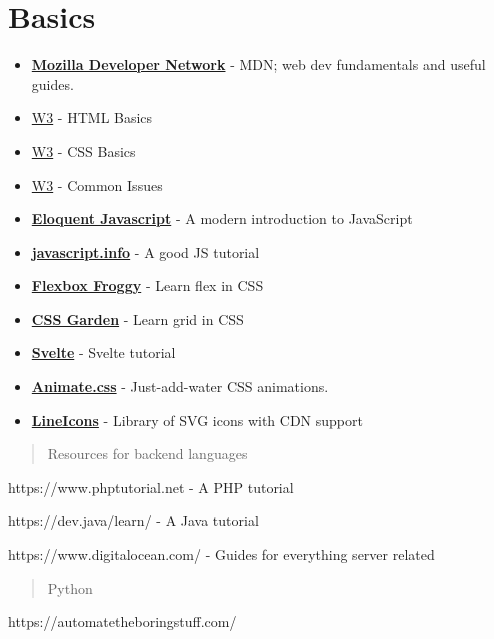 \hypertarget{basics}{%
\section{Basics}\label{basics}}

\begin{itemize}
\item
  \textbf{\href{https://developer.mozilla.org/en-US/docs/Learn}{Mozilla
  Developer Network}} - MDN; web dev fundamentals and useful guides.
\item
  \href{https://www.w3schools.com/html/default.asp}{W3} - HTML Basics
\item
  \href{https://www.w3schools.com/css/default.asp}{W3} - CSS Basics
\item
  \href{https://www.w3schools.com/howto/default.asp}{W3} - Common Issues
\item
  \textbf{\href{https://eloquentjavascript.net/Eloquent_JavaScript.pdf}{Eloquent
  Javascript}} - A modern introduction to JavaScript
\item
  \textbf{\href{https://javascript.info/}{javascript.info}} - A good JS
  tutorial
\item
  \textbf{\href{https://flexboxfroggy.com/}{Flexbox Froggy}} - Learn
  flex in CSS
\item
  \textbf{\href{https://cssgridgarden.com/}{CSS Garden}} - Learn grid in
  CSS
\item
  \textbf{\href{https://learn.svelte.dev/tutorial/welcome-to-svelte}{Svelte}}
  - Svelte tutorial
\item
  \textbf{\href{http://daneden.github.io/animate.css/}{Animate.css}} -
  Just-add-water CSS animations.
\item
  \textbf{\href{https://lineicons.com/icons/}{LineIcons}} - Library of
  SVG icons with CDN support
\end{itemize}

\begin{quote}
Resources for backend languages
\end{quote}

https://www.phptutorial.net - A PHP tutorial

https://dev.java/learn/ - A Java tutorial

https://www.digitalocean.com/ - Guides for everything server related

\begin{quote}
Python
\end{quote}

https://automatetheboringstuff.com/

